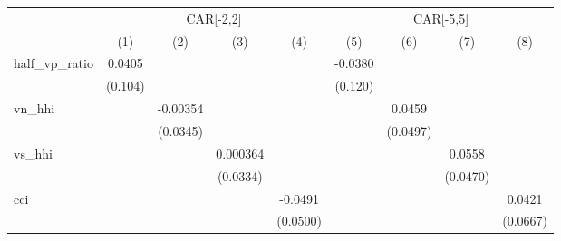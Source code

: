 {
\def\sym#1{\ifmmode^{#1}\else\(^{#1}\)\fi}
\begin{tabular}{l*{8}{c}}
\toprule
                    &\multicolumn{4}{c}{CAR[-2,2]}                                                          &\multicolumn{4}{c}{CAR[-5,5]}                                                          \\
                    &\multicolumn{1}{c}{(1)}         &\multicolumn{1}{c}{(2)}         &\multicolumn{1}{c}{(3)}         &\multicolumn{1}{c}{(4)}         &\multicolumn{1}{c}{(5)}         &\multicolumn{1}{c}{(6)}         &\multicolumn{1}{c}{(7)}         &\multicolumn{1}{c}{(8)}         \\
\midrule
half\_vp\_ratio       &      0.0405         &                     &                     &                     &     -0.0380         &                     &                     &                     \\
                    &     (0.104)         &                     &                     &                     &     (0.120)         &                     &                     &                     \\
vn\_hhi              &                     &    -0.00354         &                     &                     &                     &      0.0459         &                     &                     \\
                    &                     &    (0.0345)         &                     &                     &                     &    (0.0497)         &                     &                     \\
vs\_hhi              &                     &                     &    0.000364         &                     &                     &                     &      0.0558         &                     \\
                    &                     &                     &    (0.0334)         &                     &                     &                     &    (0.0470)         &                     \\
cci                 &                     &                     &                     &     -0.0491         &                     &                     &                     &      0.0421         \\
                    &                     &                     &                     &    (0.0500)         &                     &                     &                     &    (0.0667)         \\

\end{tabular}}
